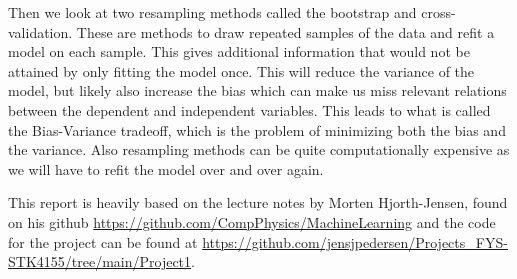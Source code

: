 Then we look at two resampling methods called the bootstrap and cross-validation. These are methods to draw repeated samples of the data and refit a model on each sample. This gives additional information that would not be attained by only fitting the model once. This will reduce the variance of the model, but likely also increase the bias which can make us miss relevant relations between the dependent and independent variables. This leads to what is called the Bias-Variance tradeoff, which is the problem of minimizing both the bias and the variance. Also resampling methods can be quite computationally expensive as we will have to refit the model over and over again.

This report is heavily based on the lecture notes by Morten Hjorth-Jensen, found on his github \href{https://github.com/CompPhysics/MachineLearning}{https://github.com/CompPhysics/MachineLearning} and the code for the project can be found at \href{https://github.com/jensjpedersen/Projects_FYS-STK4155/tree/main/Project1}{https://github.com/jensjpedersen/Projects\_FYS-STK4155/tree/main/Project1}.
